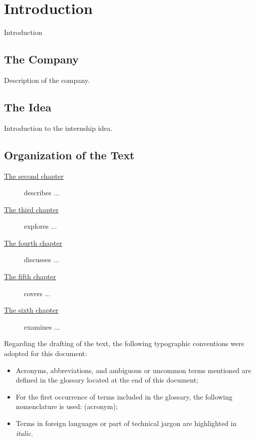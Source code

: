 \chapter{Introduction}
\label{chap:introduction}

Introduction

\section{The Company}

Description of the company.

\section{The Idea}

Introduction to the internship idea.

\section{Organization of the Text}

\begin{description}
    \item[{\hyperref[chap:literature-review]{The second chapter}}] describes ...
    
    \item[{\hyperref[chap:gap-analysis]{The third chapter}}] explores ...
    
    \item[{\hyperref[chap:system-analysis-and-design]{The fourth chapter}}] discusses ...
    
    \item[{\hyperref[chap:Methodology]{The fifth chapter}}] covers ...
    
    \item[{\hyperref[chap:conclusion]{The sixth chapter}}] examines ...
        
\end{description}

Regarding the drafting of the text, the following typographic conventions were adopted for this document:
\begin{itemize}
	\item Acronyms, abbreviations, and ambiguous or uncommon terms mentioned are defined in the glossary located at the end of this document;
    \item For the first occurrence of terms included in the glossary, the following nomenclature is used: (acronym);
	\item Terms in foreign languages or part of technical jargon are highlighted in \emph{italic}.
\end{itemize}
